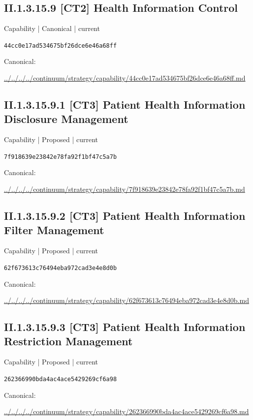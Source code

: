 \documentclass[10pt,a4paper]{article}
\begin{document}
\subsection*{II.1.3.15.9 [CT2] Health Information Control}
{\small Capability | Canonical | current}\par
\texttt{44cc0e17ad534675bf26dce6e46a68ff}\par
Canonical: \par
{\footnotesize\url{../../../../continuum/strategy/capability/44cc0e17ad534675bf26dce6e46a68ff.md}}\par
\subsection*{II.1.3.15.9.1 [CT3] Patient Health Information Disclosure Management}
{\small Capability | Proposed | current}\par
\texttt{7f918639e23842e78fa92f1bf47c5a7b}\par
Canonical: \par
{\footnotesize\url{../../../../continuum/strategy/capability/7f918639e23842e78fa92f1bf47c5a7b.md}}\par
\subsection*{II.1.3.15.9.2 [CT3] Patient Health Information Filter Management}
{\small Capability | Proposed | current}\par
\texttt{62f673613c76494eba972cad3e4e8d0b}\par
Canonical: \par
{\footnotesize\url{../../../../continuum/strategy/capability/62f673613c76494eba972cad3e4e8d0b.md}}\par
\subsection*{II.1.3.15.9.3 [CT3] Patient Health Information Restriction Management}
{\small Capability | Proposed | current}\par
\texttt{262366990bda4ac4ace5429269cf6a98}\par
Canonical: \par
{\footnotesize\url{../../../../continuum/strategy/capability/262366990bda4ac4ace5429269cf6a98.md}}\par
\end{document}
